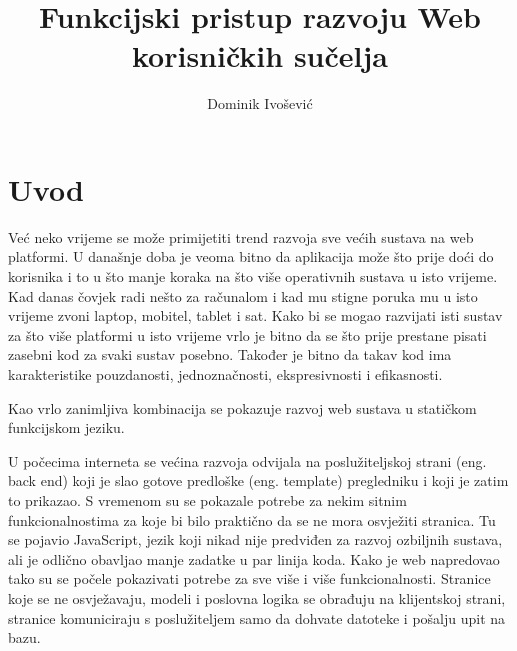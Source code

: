 \documentclass[times, utf8, zavrsni]{fer}
\begin{document}
\makeatletter
\renewcommand{\@biblabel}[1]{\stepcounter{MyBibCount}\theMyBibCount.}
\makeatother

\nocite{*}


\title{Funkcijski pristup razvoju Web korisničkih sučelja}

\author{Dominik Ivošević}	

\maketitle

\izvornik


\tableofcontents

\chapter{Uvod}
Već neko vrijeme se može primijetiti trend razvoja sve većih sustava na web platformi. U današnje doba je veoma bitno da  aplikacija može što prije doći do korisnika i to u što manje koraka na što više operativnih sustava u isto vrijeme. Kad danas čovjek radi nešto za računalom i kad mu stigne poruka mu u isto vrijeme zvoni laptop, mobitel, tablet i sat. Kako bi se mogao razvijati isti sustav za što više platformi u isto vrijeme vrlo je bitno da se što prije prestane pisati zasebni kod za svaki sustav posebno. Također je bitno da takav kod ima karakteristike pouzdanosti, jednoznačnosti, ekspresivnosti i efikasnosti.

Kao vrlo zanimljiva kombinacija se pokazuje razvoj web sustava u statičkom funkcijskom jeziku.

U počecima interneta se većina razvoja odvijala na poslužiteljskoj strani (eng. back end) koji je slao gotove predloške (eng. template) pregledniku i koji je zatim to prikazao. S vremenom su se pokazale potrebe za nekim sitnim funkcionalnostima za koje bi bilo praktično da se ne mora osvježiti stranica. Tu se pojavio JavaScript, jezik koji nikad nije predviđen za razvoj ozbiljnih sustava, ali je odlično obavljao manje zadatke u par linija koda. Kako je web napredovao tako su se počele pokazivati potrebe za sve više i više funkcionalnosti. Stranice koje se ne osvježavaju, modeli i poslovna logika se obrađuju na klijentskoj strani, stranice komuniciraju s poslužiteljem samo da dohvate datoteke i pošalju upit na bazu.
\end{document}
